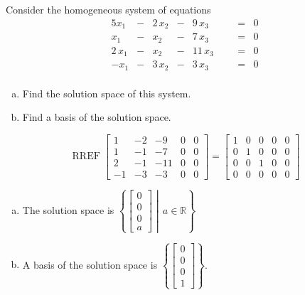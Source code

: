 
\begin{exerciseStatement}


Consider the homogeneous system of equations 
\begin{alignat*}{5} x_{1} &-& 2 \, x_{2} &-& 9 \, x_{3} & &  &=& 0 \\x_{1} &-& x_{2} &-& 7 \, x_{3} & &  &=& 0 \\2 \, x_{1} &-& x_{2} &-& 11 \, x_{3} & &  &=& 0 \\-x_{1} &-& 3 \, x_{2} &-& 3 \, x_{3} & &  &=& 0 \\ \end{alignat*}
            


\begin{enumerate}[(a)]
\item  Find the solution space of this system.
\item  Find a basis of the solution space.
\end{enumerate}
    
\end{exerciseStatement}
    
\begin{exerciseAnswer} 


\[\operatorname{RREF} \left[\begin{array}{cccc|c}
1 & -2 & -9 & 0 & 0 \\
1 & -1 & -7 & 0 & 0 \\
2 & -1 & -11 & 0 & 0 \\
-1 & -3 & -3 & 0 & 0
\end{array}\right] = \left[\begin{array}{cccc|c}
1 & 0 & 0 & 0 & 0 \\
0 & 1 & 0 & 0 & 0 \\
0 & 0 & 1 & 0 & 0 \\
0 & 0 & 0 & 0 & 0
\end{array}\right] \]


\begin{enumerate}[(a)]
\item The solution space is \( \left\{ \left[\begin{array}{c}
0 \\
0 \\
0 \\
a
\end{array}\right] \middle|\,a\in\mathbb{R}\right\} \)
\item A basis of the solution space is \( \left\{ \left[\begin{array}{c}
0 \\
0 \\
0 \\
1
\end{array}\right] \right\} \).
\end{enumerate}
    
\end{exerciseAnswer}
    
